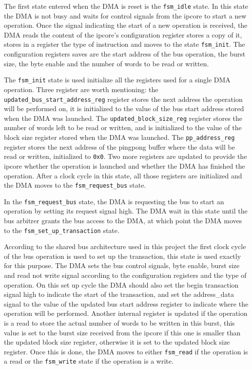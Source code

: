 \documentclass[a4paper,11pt,oneside]{report}
\begin{document}
The first state entered when the DMA is reset is the \texttt{fsm\_idle} state. In this state the DMA is not busy and waits for control signals from the ipcore to start a new operation.
Once the signal indicating the start of a new operation is received, the DMA reads the content of the ipcore's configuration register stores a copy of it, stores in a register the type
of instruction and moves to the state \texttt{fsm\_init}.
The configuration registers saves are the start address of the bus operation, the burst size, the byte enable and the number of words to be read or written.

The \texttt{fsm\_init} state is used initialize all the registers used for a single DMA operation.
Three register are worth mentioning: the \texttt{updated\_bus\_start\_address\_reg} register stores the next address the operation will be performed on, it is initialized
to the value of the bus start address stored when the DMA was launched.
The \texttt{updated\_block\_size\_reg} register stores the number of words left to be read or written, and is initialized to the value of the block size register stored when the DMA was launched.
The \texttt{pp\_address\_reg} register stores the next address of the pingpong buffer where the data will be read or written, initialized to \texttt{0x0}.
Two more registers are updated to provide the ipcore whether the operation is launched and whether the DMA has finished the operation.
After a clock cycle in this state, all those registers are initialized and the DMA moves to the \texttt{fsm\_request\_bus} state.

In the \texttt{fsm\_request\_bus} state, the DMA is requesting the bus to start an operation by setting its request signal high.
The DMA wait in this state until the bus arbitrer grants the bus access to the DMA, at which point the DMA moves to the \texttt{fsm\_set\_up\_transaction} state.

According to the shared bus architecture used in this project the first clock cycle of the bus operation is used to set up the transaction, this state is 
used exactly for this purpose.
The DMA sets the bus control signals, byte enable, burst size and read not write signal according to the configuration registers and the type of operation.
On this set up cycle the DMA should also set the begin transaction signal high to indicate the start of the transaction, and set the address\_data signal to 
the value of the updated bus start address register to indicate where the operation will be performed.
Another internal register is updated if the operation is a read to store the actual number of words to be written in this burst, this value is set to the burst size received 
from the ipcore if this one is smaller than the updated block size register, otherwise it is set to the updated block size register. 
Once this is done, the DMA moves to either \texttt{fsm\_read} if the operation is a read or the \texttt{fsm\_write} state if the operation is a write.
\end{document}
